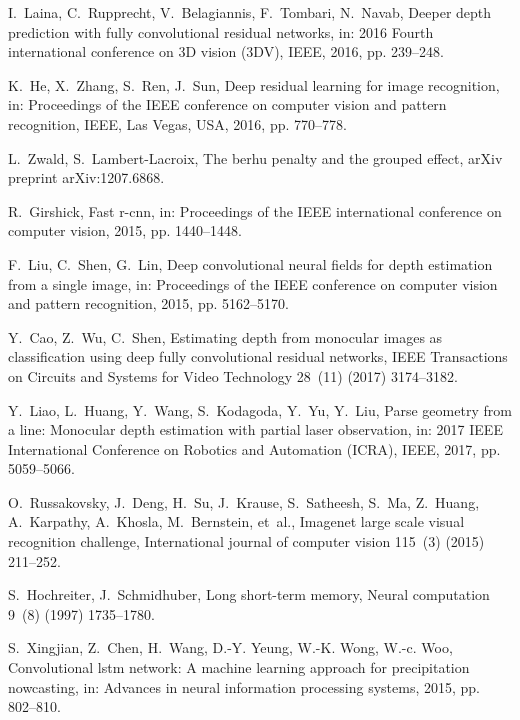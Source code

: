 \documentclass[5p]{elsarticle}
\begin{document}
\begin{thebibliography}{100}
I.~Laina, C.~Rupprecht, V.~Belagiannis, F.~Tombari, N.~Navab, Deeper depth
  prediction with fully convolutional residual networks, in: 2016 Fourth
  international conference on 3D vision (3DV), IEEE, 2016, pp. 239--248.

K.~He, X.~Zhang, S.~Ren, J.~Sun, Deep residual learning for image recognition,
  in: Proceedings of the IEEE conference on computer vision and pattern
  recognition, IEEE, Las Vegas, USA, 2016, pp. 770--778.

L.~Zwald, S.~Lambert-Lacroix, The berhu penalty and the grouped effect, arXiv
  preprint arXiv:1207.6868.

R.~Girshick, Fast r-cnn, in: Proceedings of the IEEE international conference
  on computer vision, 2015, pp. 1440--1448.

F.~Liu, C.~Shen, G.~Lin, Deep convolutional neural fields for depth estimation
  from a single image, in: Proceedings of the IEEE conference on computer
  vision and pattern recognition, 2015, pp. 5162--5170.

Y.~Cao, Z.~Wu, C.~Shen, Estimating depth from monocular images as
  classification using deep fully convolutional residual networks, IEEE
  Transactions on Circuits and Systems for Video Technology 28~(11) (2017)
  3174--3182.

Y.~Liao, L.~Huang, Y.~Wang, S.~Kodagoda, Y.~Yu, Y.~Liu, Parse geometry from a
  line: Monocular depth estimation with partial laser observation, in: 2017
  IEEE International Conference on Robotics and Automation (ICRA), IEEE, 2017,
  pp. 5059--5066.

O.~Russakovsky, J.~Deng, H.~Su, J.~Krause, S.~Satheesh, S.~Ma, Z.~Huang,
  A.~Karpathy, A.~Khosla, M.~Bernstein, et~al., Imagenet large scale visual
  recognition challenge, International journal of computer vision 115~(3)
  (2015) 211--252.

S.~Hochreiter, J.~Schmidhuber, Long short-term memory, Neural computation 9~(8)
  (1997) 1735--1780.

S.~Xingjian, Z.~Chen, H.~Wang, D.-Y. Yeung, W.-K. Wong, W.-c. Woo,
  Convolutional lstm network: A machine learning approach for precipitation
  nowcasting, in: Advances in neural information processing systems, 2015, pp.
  802--810.


\end{thebibliography}
\end{document}
